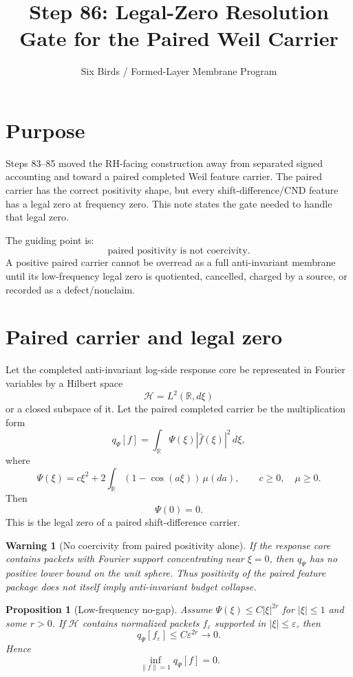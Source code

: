 \documentclass[11pt]{article}
\title{Step 86: Legal-Zero Resolution Gate for the Paired Weil Carrier}
\author{Six Birds / Formed-Layer Membrane Program}
\date{}
\newtheorem{proposition}{Proposition}
\newtheorem{warning}{Warning}
\begin{document}
\maketitle

\section{Purpose}
Steps 83--85 moved the RH-facing construction away from separated signed accounting and toward a paired completed Weil feature carrier.  The paired carrier has the correct positivity shape, but every shift-difference/CND feature has a legal zero at frequency zero.  This note states the gate needed to handle that legal zero.

The guiding point is:
\[
\boxed{\text{paired positivity is not coercivity.}}
\]
A positive paired carrier cannot be overread as a full anti-invariant membrane until its low-frequency legal zero is quotiented, cancelled, charged by a source, or recorded as a defect/nonclaim.

\section{Paired carrier and legal zero}
Let the completed anti-invariant log-side response core be represented in Fourier variables by a Hilbert space
\[
\mathcal H=L^2(\mathbb R,d\xi)
\]
or a closed subspace of it.  Let the paired completed carrier be the multiplication form
\[
q_\Psi[f]=\int_{\mathbb R}\Psi(\xi)|\widehat f(\xi)|^2\,d\xi,
\]
where
\[
\Psi(\xi)=c\xi^2+2\int_{\mathbb R}(1-\cos(a\xi))\,\mu(da),\qquad c\ge0,\quad \mu\ge0.
\]
Then
\[
\Psi(0)=0.
\]
This is the legal zero of a paired shift-difference carrier.

\begin{warning}[No coercivity from paired positivity alone]
If the response core contains packets with Fourier support concentrating near \(\xi=0\), then \(q_\Psi\) has no positive lower bound on the unit sphere.  Thus positivity of the paired feature package does not itself imply anti-invariant budget collapse.
\end{warning}

\begin{proposition}[Low-frequency no-gap]
Assume \(\Psi(\xi)\le C|\xi|^{2r}\) for \(|\xi|\le1\) and some \(r>0\).  If \(\mathcal H\) contains normalized packets \(f_\varepsilon\) supported in \(|\xi|\le\varepsilon\), then
\[
q_\Psi[f_\varepsilon]\le C\varepsilon^{2r}\to0.
\]
Hence
\[
\inf_{\|f\|=1}q_\Psi[f]=0.
\]
\end{proposition}
\end{document}

